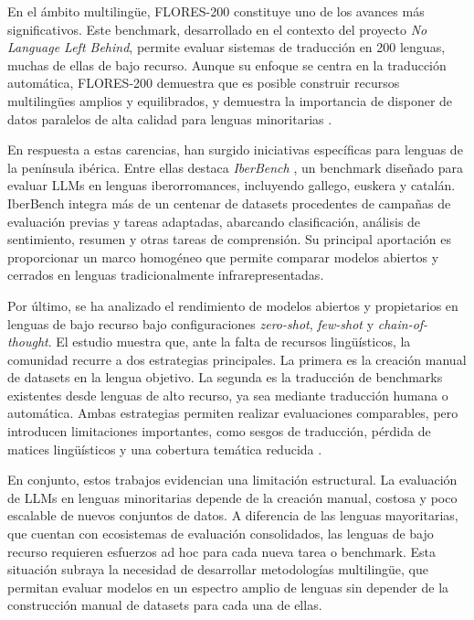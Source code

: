 En el ámbito multilingüe, FLORES-200 constituye uno de los avances más significativos. Este benchmark, desarrollado en el contexto del proyecto \textit{No Language Left Behind}, permite evaluar sistemas de traducción en 200 lenguas, muchas de ellas de bajo recurso. Aunque su enfoque se centra en la traducción automática, FLORES-200 demuestra que es posible construir recursos multilingües amplios y equilibrados, y demuestra la importancia de disponer de datos paralelos de alta calidad para lenguas minoritarias \cite{nllb2022}. 

En respuesta a estas carencias, han surgido iniciativas específicas para lenguas de la península ibérica. Entre ellas destaca \textit{IberBench} \cite{gonzalez2026iberbench}, un benchmark diseñado para evaluar LLMs en lenguas iberorromances, incluyendo gallego, euskera y catalán. IberBench integra más de un centenar de datasets procedentes de campañas de evaluación previas y tareas adaptadas, abarcando clasificación, análisis de sentimiento, resumen y otras tareas de comprensión. Su principal aportación es proporcionar un marco homogéneo que permite comparar modelos abiertos y cerrados en lenguas tradicionalmente infrarepresentadas.

Por último, se ha analizado el rendimiento de modelos abiertos y propietarios en lenguas de bajo recurso bajo configuraciones \textit{zero-shot}, \textit{few-shot} y \textit{chain-of-thought}. El estudio muestra que, ante la falta de recursos lingüísticos, la comunidad recurre a dos estrategias principales. La primera es la creación manual de datasets en la lengua objetivo. La segunda es la traducción de benchmarks existentes desde lenguas de alto recurso, ya sea mediante traducción humana o automática. Ambas estrategias permiten realizar evaluaciones comparables, pero introducen limitaciones importantes, como sesgos de traducción, pérdida de matices lingüísticos y una cobertura temática reducida \cite{NAZI2025100124}.

En conjunto, estos trabajos evidencian una limitación estructural. La evaluación de LLMs en lenguas minoritarias depende de la creación manual, costosa y poco escalable de nuevos conjuntos de datos. A diferencia de las lenguas mayoritarias, que cuentan con ecosistemas de evaluación consolidados, las lenguas de bajo recurso requieren esfuerzos ad hoc para cada nueva tarea o benchmark. Esta situación subraya la necesidad de desarrollar metodologías multilingüe, que permitan evaluar modelos en un espectro amplio de lenguas sin depender de la construcción manual de datasets para cada una de ellas.